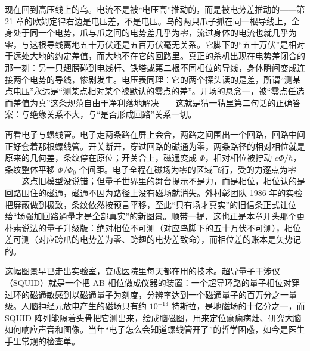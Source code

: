 
\begin{mainline}
现在回到高压线上的鸟。电流不是被“电压高”推动的，而是被电势差推动的——第 21 章的欧姆定律右边是电压差，不是电压。鸟的两只爪子抓在同一根导线上，全身处于同一个电势，爪与爪之间的电势差几乎为零，流过身体的电流也就几乎为零，与这根导线离地五十万伏还是五百万伏毫无关系。它脚下的“五十万伏”是相对于远处大地的约定差值，而大地不在它的回路里。真正的杀机出现在电势差闭合的那一刻：另一只翅膀碰到电线杆、铁塔或第二根不同相位的导线，身体瞬间变成连接两个电势的导线，惨剧发生。电压表同理：它的两个探头读的是差，所谓“测某点电压”永远是“测某点相对某个被默认的零点的差”。开场的悬念一，被“零点任选而差值为真”这条规范自由干净利落地解决——这就是猜一猜里第二句话的正确答案：与绝缘关系不大，与“是否形成回路”关系一切。

再看电子与螺线管。电子走两条路在屏上会合，两路之间围出一个回路，回路中间正好套着那根螺线管。开关断开，穿过回路的磁通为零，两条路径的相对相位就是原来的几何差，条纹停在原位；开关合上，磁通变成 \(\Phi\)，相对相位被拧动 \(e\Phi/\hbar\)，条纹整体平移 \(\Phi/\Phi_0\) 个间距。电子全程在磁场为零的区域飞行，受的力逐点为零——这点旧模型没说错；但量子世界里的舞台提示不是力，而是相位，相位认的是回路围住的磁通，磁通不因为路径上没有磁场就消失。外村彰团队 1986 年的实验把屏蔽做到极致，条纹依然按预言平移，至此“只有场才真实”的旧信条正式让位给“场强加回路通量才是全部真实”的新图景。顺带一提，这也正是本章开头那个更朴素说法的量子升级版：绝对相位不可测（对应鸟脚下的五十万伏不可测），相位差可测（对应跨爪的电势差为零、跨翅的电势差致命），而相位差的账本是矢势记的。

这幅图景早已走出实验室，变成医院里每天都在用的技术。超导量子干涉仪（SQUID）就是一个把 AB 相位做成仪器的装置：一个超导环路的量子相位对穿过环的磁通敏感到以磁通量子为刻度，分辨率达到一个磁通量子的百万分之一量级。人脑神经元放电产生的磁场只有约 \(10^{-13}\) 特斯拉，是地磁场的十亿分之一，而 SQUID 阵列能隔着头骨把它测出来，绘成脑磁图，用来定位癫痫病灶、研究大脑如何响应声音和图像。当年“电子怎么会知道螺线管开了”的哲学困惑，如今是医生手里常规的检查单。
\end{mainline}


